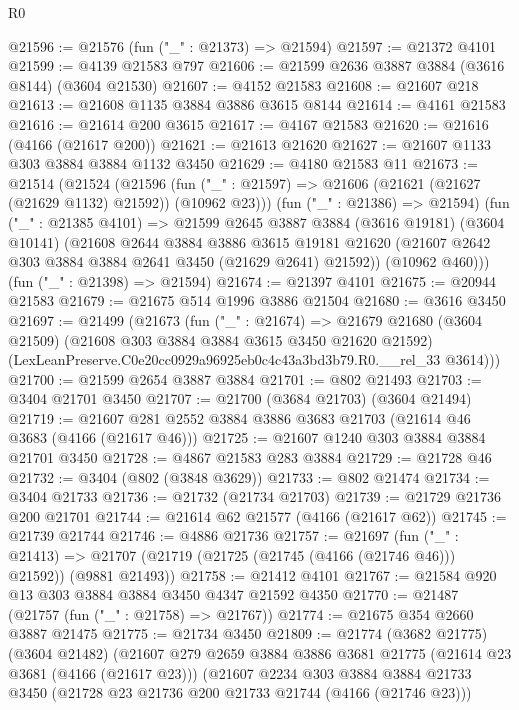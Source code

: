 \begin{lexlean}{R0}
\begin{coremodule}
@21596 := @21576 (fun ("_" : @21373) => @21594)
@21597 := @21372 @4101
@21599 := @4139 @21583 @797
@21606 := @21599 @2636 @3887 @3884 (@3616 @8144) (@3604 @21530)
@21607 := @4152 @21583
@21608 := @21607 @218
@21613 := @21608 @1135 @3884 @3886 @3615 @8144
@21614 := @4161 @21583
@21616 := @21614 @200 @3615
@21617 := @4167 @21583
@21620 := @21616 (@4166 (@21617 @200))
@21621 := @21613 @21620
@21627 := @21607 @1133 @303 @3884 @3884 @1132 @3450
@21629 := @4180 @21583 @11
@21673 := @21514
    (@21524
      (@21596 (fun ("_" : @21597) => @21606 (@21621 (@21627 (@21629 @1132) @21592)) (@10962 @23)))
      (fun ("_" : @21386) => @21594)
      (fun ("_" : @21385 @4101) =>
      @21599
        @2645
        @3887
        @3884
        (@3616 @19181)
        (@3604 @10141)
        (@21608
          @2644
          @3884
          @3886
          @3615
          @19181
          @21620
          (@21607 @2642 @303 @3884 @3884 @2641 @3450 (@21629 @2641) @21592))
        (@10962 @460)))
    (fun ("_" : @21398) => @21594)
@21674 := @21397 @4101
@21675 := @20944 @21583
@21679 := @21675 @514 @1996 @3886 @21504
@21680 := @3616 @3450
@21697 := @21499
    (@21673
      (fun ("_" : @21674) =>
      @21679
        @21680
        (@3604 @21509)
        (@21608 @303 @3884 @3884 @3615 @3450 @21620 @21592)
        (LexLeanPreserve.C0e20cc0929a96925eb0c4c43a3bd3b79.R0.__rel_33 @3614)))
@21700 := @21599 @2654 @3887 @3884
@21701 := @802 @21493
@21703 := @3404 @21701 @3450
@21707 := @21700 (@3684 @21703) (@3604 @21494)
@21719 := @21607 @281 @2552 @3884 @3886 @3683 @21703 (@21614 @46 @3683 (@4166 (@21617 @46)))
@21725 := @21607 @1240 @303 @3884 @3884 @21701 @3450
@21728 := @4867 @21583 @283 @3884
@21729 := @21728 @46
@21732 := @3404 (@802 (@3848 @3629))
@21733 := @802 @21474
@21734 := @3404 @21733
@21736 := @21732 (@21734 @21703)
@21739 := @21729 @21736 @200 @21701
@21744 := @21614 @62 @21577 (@4166 (@21617 @62))
@21745 := @21739 @21744
@21746 := @4886 @21736
@21757 := @21697
    (fun ("_" : @21413) =>
    @21707 (@21719 (@21725 (@21745 (@4166 (@21746 @46))) @21592)) (@9881 @21493))
@21758 := @21412 @4101
@21767 := @21584 @920 @13 @303 @3884 @3884 @3450 @4347 @21592 @4350
@21770 := @21487 (@21757 (fun ("_" : @21758) => @21767))
@21774 := @21675 @354 @2660 @3887 @21475
@21775 := @21734 @3450
@21809 := @21774
    (@3682 @21775)
    (@3604 @21482)
    (@21607
      @279
      @2659
      @3884
      @3886
      @3681
      @21775
      (@21614 @23 @3681 (@4166 (@21617 @23)))
      (@21607
        @2234
        @303
        @3884
        @3884
        @21733
        @3450
        (@21728 @23 @21736 @200 @21733 @21744 (@4166 (@21746 @23)))

\end{coremodule}
\end{lexlean}
